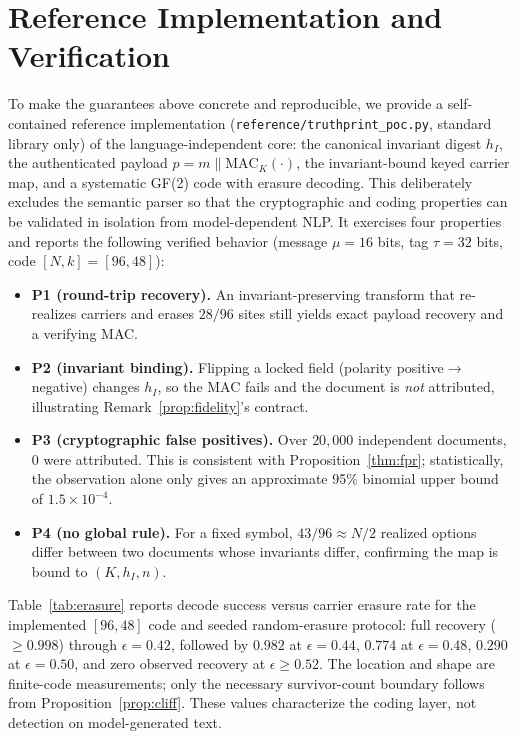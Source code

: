 \documentclass[journal]{IEEEtran}
\begin{document}
\section{Reference Implementation and Verification}
\label{sec:impl}
To make the guarantees above concrete and reproducible, we provide a self-contained reference implementation (\texttt{reference/truthprint\_poc.py}, standard library only) of the language-independent core: the canonical invariant digest $h_I$, the authenticated payload $p=m\parallel\mathrm{MAC}_K(\cdot)$, the invariant-bound keyed carrier map, and a systematic GF(2) code with erasure decoding. This deliberately excludes the semantic parser so that the cryptographic and coding properties can be validated in isolation from model-dependent NLP. It exercises four properties and reports the following verified behavior (message $\mu=16$ bits, tag $\tau=32$ bits, code $[N,k]=[96,48]$):
\begin{itemize}[leftmargin=*]
  \item \textbf{P1 (round-trip recovery).} An invariant-preserving transform that re-realizes carriers and erases $28/96$ sites still yields exact payload recovery and a verifying MAC.
  \item \textbf{P2 (invariant binding).} Flipping a locked field (polarity positive$\to$negative) changes $h_I$, so the MAC fails and the document is \emph{not} attributed, illustrating Remark~\ref{prop:fidelity}'s contract.
  \item \textbf{P3 (cryptographic false positives).} Over $20{,}000$ independent documents, $0$ were attributed. This is consistent with Proposition~\ref{thm:fpr}; statistically, the observation alone only gives an approximate 95\% binomial upper bound of $1.5\times10^{-4}$.
  \item \textbf{P4 (no global rule).} For a fixed symbol, $43/96\approx N/2$ realized options differ between two documents whose invariants differ, confirming the map is bound to $(K,h_I,n)$.
\end{itemize}
Table~\ref{tab:erasure} reports decode success versus carrier erasure rate for
the implemented $[96,48]$ code and seeded random-erasure protocol: full
recovery ($\geq0.998$) through $\epsilon=0.42$, followed by $0.982$ at
$\epsilon=0.44$, $0.774$ at $\epsilon=0.48$, $0.290$ at $\epsilon=0.50$, and
zero observed recovery at $\epsilon\geq0.52$. The location and shape are
finite-code measurements; only the necessary survivor-count boundary follows
from Proposition~\ref{prop:cliff}. These values characterize the coding layer,
not detection on model-generated text.
\end{document}
